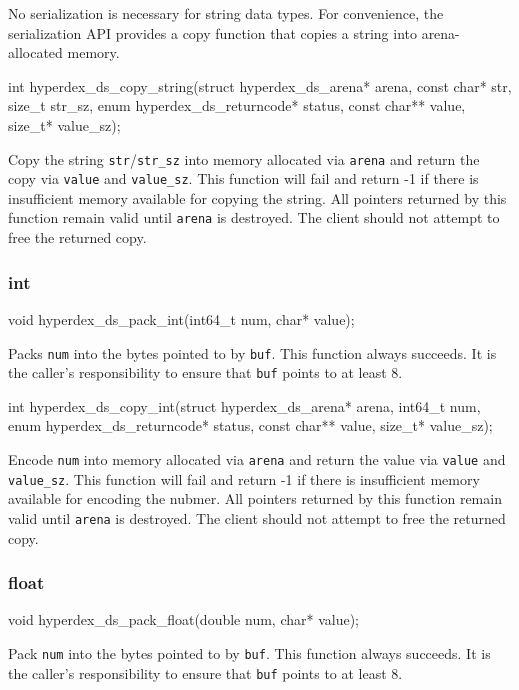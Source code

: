 No serialization is necessary for string data types.  For convenience, the
serialization API provides a copy function that copies a string into
arena-allocated memory.

\begin{ccode}
int hyperdex_ds_copy_string(struct hyperdex_ds_arena* arena, const char* str,
                            size_t str_sz, enum hyperdex_ds_returncode* status,
                            const char** value, size_t* value_sz);
\end{ccode}
\funcdesc  Copy the string \texttt{str}/\texttt{str\_sz} into memory allocated
via \texttt{arena} and return the copy via \texttt{value} and
\texttt{value\_sz}.  This function will fail and return -1 if there is
insufficient memory available for copying the string.  All pointers returned by
this function remain valid until \texttt{arena} is destroyed.  The client should
not attempt to free the returned copy.

\subsubsection{int}

\begin{ccode}
void hyperdex_ds_pack_int(int64_t num, char* value);
\end{ccode}
\funcdesc Packs \texttt{num} into the bytes pointed to by \texttt{buf}.  This
function always succeeds.  It is the caller's responsibility to ensure that
\texttt{buf} points to at least \unit{8}{\byte}.

\funcsep
\begin{ccode}
int hyperdex_ds_copy_int(struct hyperdex_ds_arena* arena, int64_t num,
                         enum hyperdex_ds_returncode* status,
                         const char** value, size_t* value_sz);
\end{ccode}
\funcdesc Encode \texttt{num} into memory allocated via \texttt{arena} and
return the value via \texttt{value} and \texttt{value\_sz}.  This function will
fail and return -1 if there is insufficient memory available for encoding the
nubmer.  All pointers returned by this function remain valid until
\texttt{arena} is destroyed.  The client should not attempt to free the returned
copy.

\subsubsection{float}

\begin{ccode}
void hyperdex_ds_pack_float(double num, char* value);
\end{ccode}
\funcdesc Pack \texttt{num} into the bytes pointed to by \texttt{buf}.  This
function always succeeds.  It is the caller's responsibility to ensure that
\texttt{buf} points to at least \unit{8}{\byte}.

